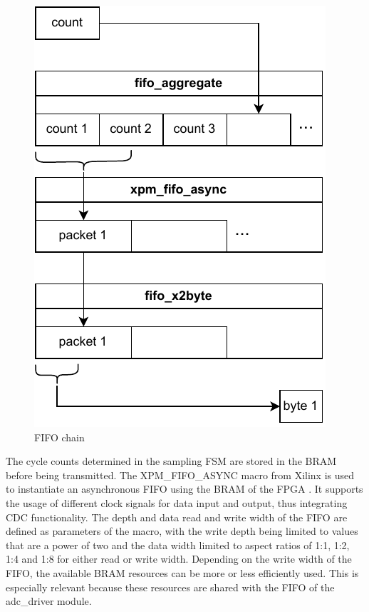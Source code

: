 \documentclass[
	english,
	ruledheaders=section, %
	class=report,%
	thesis={type=Project Seminar Report},%
	accentcolor=TUDa-1d, %
	custommargins=false,%
	marginpar=false,%
	parskip=half-,%
	fontsize=11pt,%
]{tudapub}
\begin{document}
\begin{figure}
    \vspace{-7pt}
    \centering
    \includegraphics{drawings/fifo_chain.pdf}
    \caption{FIFO chain}
    \label{drw:fifo_chain}
    \vspace{-50pt}
\end{figure}
The cycle counts determined in the sampling \gls{FSM} are stored in the \gls{BRAM} before being transmitted. The XPM\_FIFO\_ASYNC macro from Xilinx is used to instantiate an asynchronous \gls{FIFO} using the \gls{BRAM} of the \gls{FPGA} \autocite{xilinxVivadoDesignSuite2023}. It supports the usage of different clock signals for data input and output, thus integrating \gls{CDC} functionality. The depth and data read and write width of the \gls{FIFO} are defined as parameters of the macro, with the write depth being limited to values that are a power of two and the data width limited to aspect ratios of 1:1, 1:2, 1:4 and 1:8 for either read or write width. Depending on the write width of the \gls{FIFO}, the available \gls{BRAM} resources can be more or less efficiently used. This is especially relevant because these resources are shared with the \gls{FIFO} of the adc\_driver module.
\end{document}
